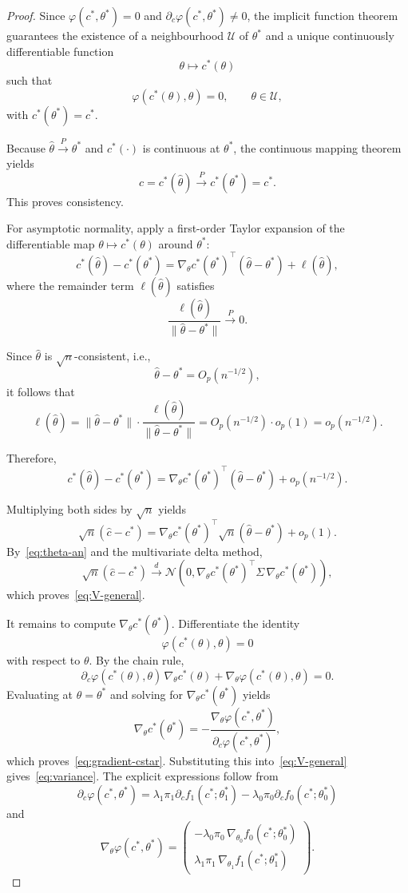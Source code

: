 \documentclass[10pt,a4paper]{amsart}
\begin{document}
\begin{proof}
Since $\varphi(c^*,\theta^*)=0$ and $\partial_c\varphi(c^*,\theta^*)\neq 0$, the implicit function theorem guarantees the existence of a neighbourhood $\mathcal U$ of $\theta^*$ and a unique continuously differentiable function
\[
\theta\mapsto c^*(\theta)
\]
such that
\[
\varphi(c^*(\theta),\theta)=0,
\qquad
\theta\in\mathcal U,
\]
with $c^*(\theta^*)=c^*$.

\noindent
Because $\hat\theta\xrightarrow{P}\theta^*$ and $c^*(\cdot)$ is continuous at $\theta^*$, the continuous mapping theorem yields
\[
\hat c=c^*(\hat\theta)\xrightarrow{P}c^*(\theta^*)=c^*.
\]
This proves consistency.

For asymptotic normality, apply a first-order Taylor expansion of the differentiable map $\theta \mapsto c^*(\theta)$ around $\theta^*$:
\[
c^*(\hat\theta)-c^*(\theta^*)
=
\nabla_\theta c^*(\theta^*)^\top(\hat\theta-\theta^*)
+
\ell (\hat\theta),
\]
where the remainder term $\ell(\hat\theta)$ satisfies
\[
\frac{\ell(\hat\theta)}{\|\hat\theta-\theta^*\|} \xrightarrow{P} 0.
\]

\noindent
Since $\hat\theta$ is $\sqrt{n}$-consistent, i.e.,
\[
\hat\theta - \theta^* = O_p(n^{-1/2}),
\]
it follows that
\[
\ell(\hat\theta)
=
\|\hat\theta-\theta^*\|
\cdot
\frac{\ell(\hat\theta)}{\|\hat\theta-\theta^*\|}
=
O_p(n^{-1/2}) \cdot o_p(1)
=
o_p(n^{-1/2}).
\]

\noindent
Therefore,
\[
c^*(\hat\theta)-c^*(\theta^*)
=
\nabla_\theta c^*(\theta^*)^\top(\hat\theta-\theta^*)
+
o_p(n^{-1/2}).
\]

\noindent
Multiplying both sides by $\sqrt{n}$ yields
\[
\sqrt{n}(\hat c-c^*)
=
\nabla_\theta c^*(\theta^*)^\top \sqrt{n}(\hat\theta-\theta^*)
+
o_p(1).
\]
By~\eqref{eq:theta-an} and the multivariate delta method,
\[
\sqrt n(\hat c-c^*)
\stackrel{d}{\longrightarrow}
\mathcal N\!\left(
0,
\nabla_\theta c^*(\theta^*)^\top\Sigma\,\nabla_\theta c^*(\theta^*)
\right),
\]
which proves~\eqref{eq:V-general}.

\noindent
It remains to compute $\nabla_\theta c^*(\theta^*)$. Differentiate the identity
\[
\varphi(c^*(\theta),\theta)=0
\]
with respect to $\theta$. By the chain rule,
\[
\partial_c\varphi(c^*(\theta),\theta)\,\nabla_\theta c^*(\theta)
+
\nabla_\theta\varphi(c^*(\theta),\theta)
=
0.
\]
Evaluating at $\theta=\theta^*$ and solving for $\nabla_\theta c^*(\theta^*)$ yields
\[
\nabla_\theta c^*(\theta^*)
= -\frac{\nabla_\theta\varphi(c^*,\theta^*)}{\partial_c\varphi(c^*,\theta^*)},\]
which proves~\eqref{eq:gradient-cstar}. Substituting this into~\eqref{eq:V-general} gives~\eqref{eq:variance}. The explicit expressions follow from
\[
\partial_c\varphi(c^*,\theta^*)
=
\lambda_1\pi_1 \partial_c f_1(c^*;\theta_1^*)-\lambda_0\pi_0 \partial_c f_0(c^*;\theta_0^*)
\]
and
\[
\nabla_\theta\varphi(c^*,\theta^*)
=
\begin{pmatrix}
-\lambda_0\pi_0\,\nabla_{\theta_0}f_0(c^*;\theta_0^*)\\[0.4em]
\lambda_1\pi_1\,\nabla_{\theta_1}f_1(c^*;\theta_1^*)
\end{pmatrix}.
\]
\end{proof}
\end{document}
